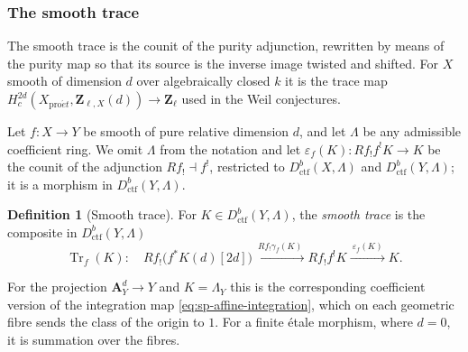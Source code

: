 \documentclass[11pt,a4paper]{article}
\numberwithin{equation}{section}
\theoremstyle{definition}
\newtheorem{definition}[theorem]{Definition}
\theoremstyle{remark}
\newcommand{\Zl}{\mathbf Z_\ell}
\newcommand{\proet}{\mathrm{pro}\acute{e}t}
\newcommand{\Dctf}{D^b_{\mathrm{ctf}}}
\begin{document}
\subsubsection{The smooth trace}

The smooth trace is the counit of the purity adjunction, rewritten by
means of the purity map so that its source is the inverse image twisted
and shifted. For $X$ smooth of dimension $d$ over algebraically closed
$k$ it is the trace map
$H_c^{2d}(X_{\proet},\mathbf Z_{\ell,X}(d))\to\Zl$ used in the Weil
conjectures.

Let $f:X\to Y$ be smooth of pure relative dimension $d$, and let
$\Lambda$ be any admissible coefficient ring. We omit $\Lambda$ from
the notation and let $\varepsilon_f(K):Rf_!f^!K\to K$ be the counit
of the adjunction $Rf_!\dashv f^!$, restricted to $\Dctf(X,\Lambda)$
and $\Dctf(Y,\Lambda)$; it is a morphism in $\Dctf(Y,\Lambda)$.

\begin{definition}[Smooth trace]\label{def:sp-trace}
For $K\in\Dctf(Y,\Lambda)$, the \emph{smooth trace} is the composite in $\Dctf(Y,\Lambda)$
\begin{equation}\label{eq:sp-trace}
 \operatorname{Tr}_{f}(K):\quad
 Rf_!\bigl(f^{*}K(d)[2d]\bigr)
    \xrightarrow{\ Rf_!\gamma_{f}(K)\ }
                   Rf_!f^!K
    \xrightarrow{\ \varepsilon_{f}(K)\ }K.
\end{equation}
\end{definition}

For the projection $\mathbf A^d_Y\to Y$ and $K=\Lambda_Y$ this
is the corresponding coefficient version of the integration map
\eqref{eq:sp-affine-integration}, which on each geometric fibre sends
the class of the origin to $1$. For a finite \'etale morphism, where
$d=0$, it is summation over the fibres.
\end{document}
